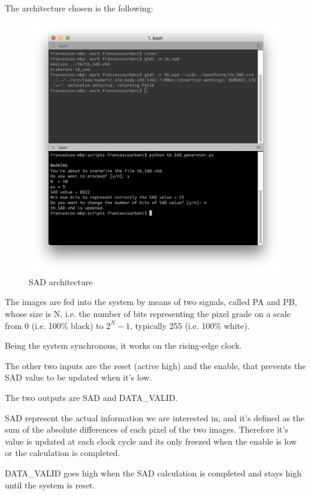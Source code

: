 \documentclass[12pt, a4paper]{article}
\begin{document}
The architecture chosen is the following:



\begin{figure}
\centering
\includegraphics[scale=0.5]{../screenshots/fig1.png}
\caption{SAD architecture}\label{fig:7}
\end{figure}




The images are fed into the system by means of two signals, called PA and PB, whose size is N, i.e. the number of bits representing the pixel grade on a scale from 0 (i.e. 100\% black) to $2^N-1$, typically 255 (i.e. 100\% white).

Being the system synchronous, it works on the rising-edge clock.

The other two inputs are the reset (active high) and the enable, that prevents the SAD value to be updated when it's low.

The two outputs are SAD and DATA\_VALID. 

SAD represent the actual information we are interested in, and it's defined as the sum of the absolute differences of each pixel of the two images. 
Therefore it's value is updated at each clock cycle and its only freezed when the enable is low or the calculation is completed.

DATA\_VALID goes high when the SAD calculation is completed and stays high until the system is reset.
\end{document}
